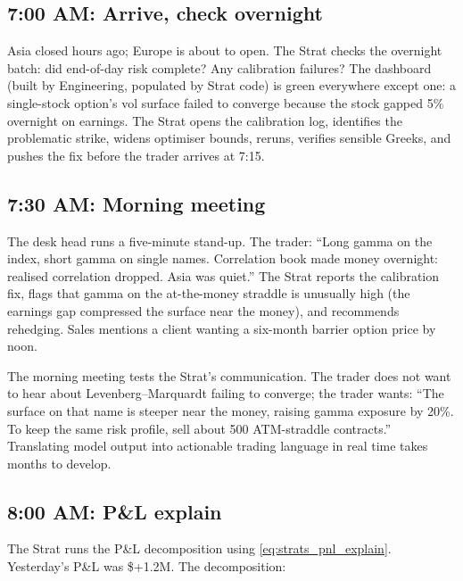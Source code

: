 \subsection{7:00 AM: Arrive, check overnight}

Asia closed hours ago; Europe is about to open.  The Strat checks
the overnight batch: did end-of-day risk complete?  Any calibration
failures?  The dashboard (built by Engineering, populated by Strat
code) is green everywhere except one: a single-stock option's vol
surface failed to converge because the stock gapped 5\% overnight
on earnings.  The Strat opens the calibration log, identifies the
problematic strike, widens optimiser bounds, reruns, verifies
sensible Greeks, and pushes the fix before the trader arrives at
7:15.

\subsection{7:30 AM: Morning meeting}

The desk head runs a five-minute stand-up.  The trader: ``Long
gamma on the index, short gamma on single names.  Correlation book
made money overnight: realised correlation dropped.  Asia was
quiet.''  The Strat reports the calibration fix, flags that gamma on
the at-the-money straddle is unusually high (the earnings gap
compressed the surface near the money), and recommends rehedging.
Sales mentions a client wanting a six-month barrier option price by
noon.

The morning meeting tests the Strat's communication.  The trader
does not want to hear about Levenberg--Marquardt failing to
converge; the trader wants: ``The surface on that name is steeper
near the money, raising gamma exposure by 20\%.  To keep the same
risk profile, sell about 500 ATM-straddle contracts.''  Translating
model output into actionable trading language in real time takes
months to develop.

\subsection{8:00 AM: P\&L explain}

The Strat runs the P\&L decomposition using
\cref{eq:strats_pnl_explain}.  Yesterday's P\&L was \$+1.2M.  The
decomposition:

